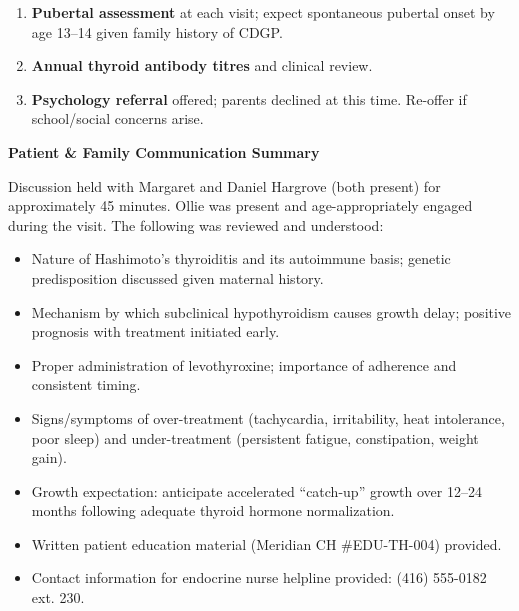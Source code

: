 \documentclass[11pt,a4paper]{article}
\begin{document}
\begin{tcolorbox}[pedteal, title={\faTasks\enspace Management Plan}]
\begin{minipage}[t]{0.48\linewidth}
\begin{enumerate}[leftmargin=1.4em, itemsep=3pt, topsep=2pt,
    label={\color{PedTeal}\textbf{\arabic*.}}]
          \textbf{6 months} pending normalization of thyroid function.
          Will reassess IGF-1 and IGFBP-3 at 6-month follow-up.
    \item \textbf{Pubertal assessment} at each visit; expect spontaneous
          pubertal onset by age 13--14 given family history of CDGP.
    \item \textbf{Annual thyroid antibody titres} and clinical review.
    \item \textbf{Psychology referral} offered; parents declined at
          this time. Re-offer if school/social concerns arise.
  \end{enumerate}
\end{minipage}

\end{tcolorbox}

\vspace{3mm}

\begin{tcolorbox}[pedinfostrip]
  {\small\color{PedBlue}\textbf{\faComments\enspace Patient \& Family Communication Summary}}\\[5pt]
  {\small
  Discussion held with Margaret and Daniel Hargrove (both present) for approximately
  45 minutes. Ollie was present and age-appropriately engaged during the visit.
  The following was reviewed and understood:
  \begin{itemize}[leftmargin=1.4em, itemsep=2pt, topsep=3pt,
    label={\color{PedTeal}\faCheck}]
    \item Nature of Hashimoto's thyroiditis and its autoimmune basis; genetic predisposition
          discussed given maternal history.
    \item Mechanism by which subclinical hypothyroidism causes growth delay; positive prognosis
          with treatment initiated early.
    \item Proper administration of levothyroxine; importance of adherence and consistent timing.
    \item Signs/symptoms of over-treatment (tachycardia, irritability, heat intolerance, poor sleep)
          and under-treatment (persistent fatigue, constipation, weight gain).
    \item Growth expectation: anticipate accelerated ``catch-up'' growth over 12--24 months
          following adequate thyroid hormone normalization.
    \item Written patient education material (Meridian CH \#EDU-TH-004) provided.
    \item Contact information for endocrine nurse helpline provided: (416) 555-0182 ext. 230.
  \end{itemize}
  }
\end{tcolorbox}
\end{document}
